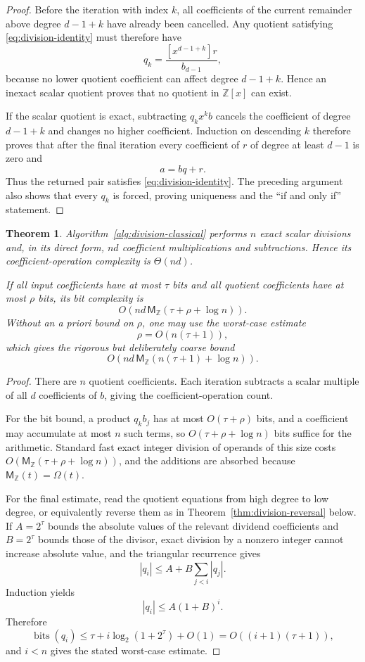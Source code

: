 \documentclass[11pt]{book}
\newtheorem{theorem}{Theorem}[section]
\theoremstyle{definition}
\newcommand{\ZZ}{\mathbb Z}
\newcommand{\bits}{\operatorname{bits}}
\newcommand{\MZ}{\mathsf M_{\ZZ}}
\begin{document}
\begin{proof}
Before the iteration with index $k$, all coefficients of the current remainder
above degree $d-1+k$ have already been cancelled.  Any quotient satisfying
\eqref{eq:division-identity} must therefore have
\[
 q_k=\frac{[x^{d-1+k}]r}{b_{d-1}},
\]
because no lower quotient coefficient can affect degree $d-1+k$.  Hence an
inexact scalar quotient proves that no quotient in $\ZZ[x]$ can exist.

If the scalar quotient is exact, subtracting $q_kx^kb$ cancels the coefficient
of degree $d-1+k$ and changes no higher coefficient.  Induction on descending
$k$ therefore proves that after the final iteration every coefficient of $r$
of degree at least $d-1$ is zero and
\[
 a=bq+r.
\]
Thus the returned pair satisfies \eqref{eq:division-identity}.  The preceding
argument also shows that every $q_k$ is forced, proving uniqueness and the
``if and only if'' statement.
\end{proof}

\begin{theorem}\label{thm:division-classical-complexity}
Algorithm~\ref{alg:division-classical} performs $n$ exact scalar divisions and,
in its direct form, $nd$ coefficient multiplications and subtractions.  Hence
its coefficient-operation complexity is $\Theta(nd)$.

If all input coefficients have at most $\tau$ bits and all quotient
coefficients have at most $\rho$ bits, its bit complexity is
\[
 O\!\left(nd\,\MZ(\tau+\rho+\log n)\right).
\]
Without an a priori bound on $\rho$, one may use the worst-case estimate
\[
 \rho=O\!\left(n(\tau+1)\right),
\]
which gives the rigorous but deliberately coarse bound
\[
 O\!\left(nd\,\MZ(n(\tau+1)+\log n)\right).
\]
\end{theorem}

\begin{proof}
There are $n$ quotient coefficients.  Each iteration subtracts a scalar
multiple of all $d$ coefficients of $b$, giving the coefficient-operation
count.

For the bit bound, a product $q_kb_j$ has at most
$O(\tau+\rho)$ bits, and a coefficient may accumulate at most $n$ such terms,
so $O(\tau+\rho+\log n)$ bits suffice for the arithmetic.  Standard fast exact
integer division of operands of this size costs
$O(\MZ(\tau+\rho+\log n))$, and the additions are absorbed because
$\MZ(t)=\Omega(t)$.

For the final estimate, read the quotient equations from high degree to low
degree, or equivalently reverse them as in
Theorem~\ref{thm:division-reversal} below.  If $A=2^\tau$ bounds the absolute
values of the relevant dividend coefficients and $B=2^\tau$ bounds those of
the divisor, exact division by a nonzero integer cannot increase absolute
value, and the triangular recurrence gives
\[
 |q_i|\leq A+B\sum_{j<i}|q_j|.
\]
Induction yields
\[
 |q_i|\leq A(1+B)^i.
\]
Therefore
\[
 \bits(q_i)\leq \tau+i\log_2(1+2^\tau)+O(1)
              =O((i+1)(\tau+1)),
\]
and $i<n$ gives the stated worst-case estimate.
\end{proof}
\end{document}
